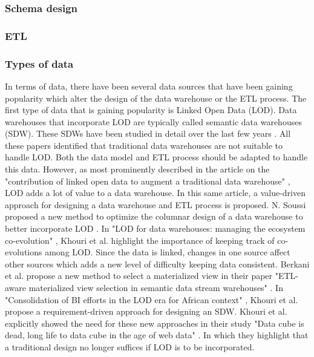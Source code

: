 \documentclass[11pt]{article}
\begin{document}
\subsubsection{Schema design}

\subsubsection{ETL}

\subsubsection{Types of data}
In terms of data, there have been several data sources that have been gaining popularity which alter the design of the data warehouse or the ETL process. The first type of data that is gaining popularity is Linked Open Data (LOD). Data warehouses that incorporate LOD are typically called semantic data warehouses (SDW). These SDWs have been studied in detail over the last few years \cite{Berkani2020397, Berkani20181ETL, Khouri2018, Khouri20181, khouri2019data, Soussi2023762}. All these papers identified that traditional data warehouses are not suitable to handle LOD. Both the data model and ETL process should be adapted to handle this data. However, as most prominently described in the article on the "contribution of linked open data to augment a traditional data warehouse" \cite{Berkani2020397}, LOD adds a lot of value to a data warehouse. In this same article, a value-driven approach for designing a data warehouse and ETL process is proposed. N. Soussi proposed a new method to optimize the columnar design of a data warehouse to better incorporate LOD \cite{Soussi2023762}. In "LOD for data warehouses: managing the ecosystem co-evolution" \cite{Khouri2018}, Khouri et al. highlight the importance of keeping track of co-evolutions among LOD. Since the data is linked, changes in one source affect other sources which adds a new level of difficulty keeping data consistent. Berkani et al. propose a new method to select a materialized view in their paper "ETL-aware materialized view selection in semantic data stream warehouses" \cite{Berkani20181ETL}. In "Consolidation of BI efforts in the LOD era for African context" \cite{Khouri20181}, Khouri et al. propose a requirement-driven approach for designing an SDW. Khouri et al. explicitly showed the need for these new approaches in their study "Data cube is dead, long life to data cube in the age of web data" \cite{khouri2019data}. In which they highlight that a traditional design no longer suffices if LOD is to be incorporated. \\
\end{document}
